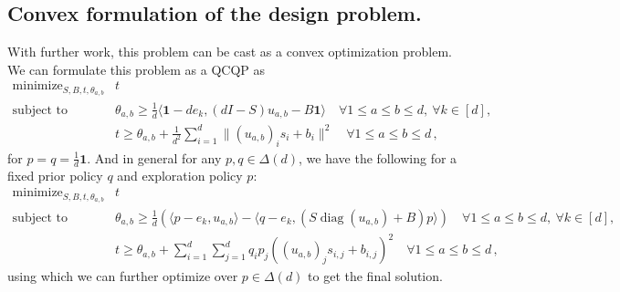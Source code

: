 \documentclass{article}
\theoremstyle{plain}
\theoremstyle{definition}
\theoremstyle{plain}
\begin{document}
\subsection{Convex formulation of the design problem.}
\label{sec:convex_program_formulation}
With further work, this problem can be cast as a convex optimization problem.
We can formulate this problem as a QCQP as
\[
    \boxed{
        \begin{array}{ll}
            \text{minimize}_{S,B,t,\theta_{a,b}} & t                                                                                                 \\[1mm]
            \text{subject to}
                                                 & \theta_{a,b} \ge \frac{1}{d} \langle \mathbf{1} - d e_k, (d I - S) u_{a,b} - B \mathbf{1} \rangle
            \quad \forall 1\le a\le b\le d,\ \forall k\in[d],                                                                                        \\[1mm]
                                                 & t \ge \theta_{a,b}+\frac{1}{d^2}\sum_{i=1}^d\|(u_{a,b})_i s_i+b_i\|^2
            \quad \forall 1\le a\le b\le d\,,
        \end{array}
    }
\]
for $p = q = \frac{1}{d} \mathbf{1}$.
And in general for any $p, q \in \Delta(d)$, we have the following for a fixed prior policy $q$ and exploration policy $p$:
\[
    \boxed{
        \begin{array}{ll}
            \text{minimize}_{S,B,t,\theta_{a,b}} & t                                                                                                                                           \\[1mm]
            \text{subject to}
                                                 & \theta_{a,b} \ge \frac{1}{d}\left(\langle p - e_k, u_{a,b} \rangle - \langle q - e_k, (S \operatorname{diag}(u_{a,b}) + B) p \rangle\right)
            \quad \forall 1\le a\le b\le d,\ \forall k\in[d],                                                                                                                                  \\[1mm]
                                                 & t \ge \theta_{a,b}+\sum_{i=1}^d \sum_{j=1}^d q_i p_j ((u_{a,b})_j s_{i,j} + b_{i,j})^2
            \quad \forall 1\le a\le b\le d\,,
        \end{array}
    }
\]
using which we can further optimize over $p \in \Delta(d)$ to get the final solution.
\end{document}
